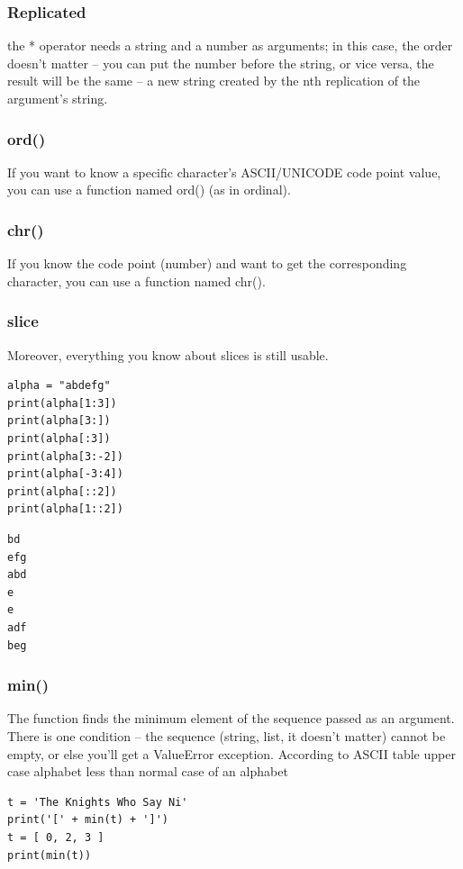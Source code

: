 \documentclass[11pt]{article}
\begin{document}
\subsubsection{Replicated}
\label{sec:org02e77a4}
the * operator needs a string and a number as arguments; in this case,
the order doesn’t matter – you can put the number before the string,
or vice versa, the result will be the same – a new string created by
the nth replication of the argument’s string.

\subsubsection{ord()}
\label{sec:orgd614c96}
If you want to know a specific character’s ASCII/UNICODE code point
value, you can use a function named ord() (as in ordinal).

\subsubsection{chr()}
\label{sec:org500eac7}
If you know the code point (number) and want to get the corresponding
character, you can use a function named chr().

\subsubsection{slice}
\label{sec:org5950b10}
Moreover, everything you know about slices is still usable. 

\begin{verbatim}
alpha = "abdefg"
print(alpha[1:3])
print(alpha[3:])
print(alpha[:3])
print(alpha[3:-2])
print(alpha[-3:4])
print(alpha[::2])
print(alpha[1::2])
\end{verbatim}

\begin{verbatim}
bd
efg
abd
e
e
adf
beg
\end{verbatim}

\subsubsection{min()}
\label{sec:orge6375de}
The function finds the minimum element of the sequence passed as an
argument. There is one condition – the sequence (string, list, it
doesn’t matter) cannot be empty, or else you’ll get a ValueError
exception. According to ASCII table upper case alphabet less than
normal case of an alphabet

\begin{verbatim}
t = 'The Knights Who Say Ni'
print('[' + min(t) + ']')
t = [ 0, 2, 3 ]
print(min(t))
\end{verbatim}
\end{document}
